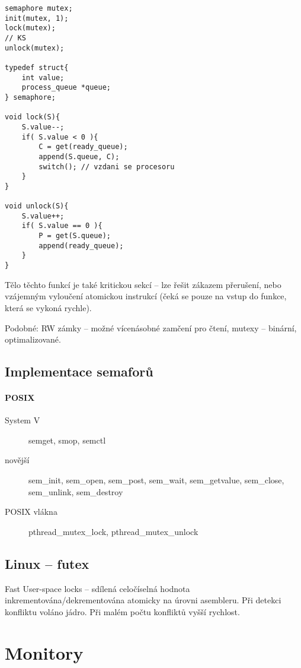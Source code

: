 \documentclass[a4paper, 11pt]{report}
\begin{document}
\begin{lstlisting}
semaphore mutex;
init(mutex, 1);
lock(mutex);
// KS
unlock(mutex);

typedef struct{
	int value;
	process_queue *queue;
} semaphore;

void lock(S){
	S.value--;
	if( S.value < 0 ){
		C = get(ready_queue);
		append(S.queue, C);
		switch(); // vzdani se procesoru
	}
}

void unlock(S){
	S.value++;
	if( S.value == 0 ){
		P = get(S.queue);
		append(ready_queue);
	}
}
\end{lstlisting}

Tělo těchto funkcí je také kritickou sekcí -- lze řešit zákazem přerušení, nebo vzájemným vyloučení atomickou instrukcí (čeká se pouze na vstup do funkce, která se vykoná rychle).

Podobné: RW zámky -- možné vícenásobné zamčení pro čtení, mutexy -- binární, optimalizované.


\subsection{Implementace semaforů}

\paragraph{POSIX}
\begin{description}
	\item[System V] semget, smop, semctl 
	\item[novější] sem\_init, sem\_open, sem\_post, sem\_wait, sem\_getvalue, sem\_close, sem\_unlink, sem\_destroy
	\item[POSIX vlákna] pthread\_mutex\_lock, pthread\_mutex\_unlock
\end{description}

\subsection{Linux -- futex}

Fast User-space locks -- sdílená celočíselná hodnota inkrementována/dekrementována atomicky na úrovni asembleru. Při detekci konfliktu voláno jádro. Při malém počtu konfliktů vyšší rychlost.

\section{Monitory}
\end{document}
